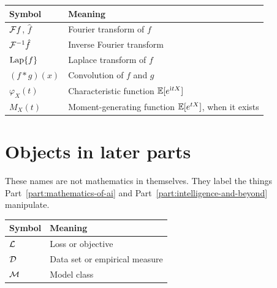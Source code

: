 \begin{table}[htbp]
\centering
{}
\label{tab:notation-transforms}
\begin{tabular}{@{}ll@{}}
\toprule
Symbol & Meaning \\
\midrule
$\mathcal{F} f$, $\hat{f}$ & Fourier transform of $f$ \\
$\mathcal{F}^{-1}\hat{f}$ & Inverse Fourier transform \\
$\mathrm{Lap}\{f\}$ & Laplace transform of $f$ \\
$(f*g)(x)$ & Convolution of $f$ and $g$ \\
$\varphi_X(t)$ & Characteristic function $\mathbb{E}[e^{\mathrm{i}tX}]$ \\
$M_X(t)$ & Moment-generating function $\mathbb{E}[e^{tX}]$, when it exists \\
\bottomrule
\end{tabular}
\end{table}

\section*{Objects in later parts}
\label{not:objects}

These names are not mathematics in themselves. They label the things Part~\ref{part:mathematics-of-ai} and Part~\ref{part:intelligence-and-beyond} manipulate.

\begin{table}[htbp]
\centering
{}
\label{tab:notation-objects}
\begin{tabular}{@{}ll@{}}
\toprule
Symbol & Meaning \\
\midrule
$\mathcal{L}$ & Loss or objective \\
$\mathcal{D}$ & Data set or empirical measure \\
$\mathcal{M}$ & Model class \\
\bottomrule
\end{tabular}
\end{table}

\endgroup
